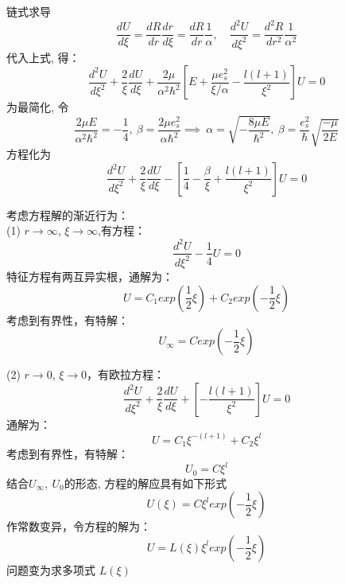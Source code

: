 \begin{frame}	
链式求导
\[\frac{d U }{d \xi } = \frac{d R }{d r } \frac{d r }{d \xi } = \frac{d R }{d r } \frac{1}{\alpha}, \quad \frac{d^2 U }{d \xi ^2 } =  \frac{d^2 R }{d r^2 } \frac{1}{\alpha ^2}\]
代入上式, 得：
\begin{equation*}
\frac{d^2 U}{d \xi ^2} + \frac{2}{\xi }\frac{d U }{d \xi} + \dfrac{2\mu}{\alpha ^2 \hbar^2}\left[E+\dfrac{\mu e^2 _s}{\xi/\alpha} - \frac{l(l+1)}{\xi ^2}\right] U=0  
\end{equation*}	
为最简化, 令 
\[ \dfrac{2\mu E}{\alpha ^2 \hbar^2}= -\frac{1} {4}, ~\beta=\dfrac{2\mu e^2 _s}{\alpha \hbar^2} \implies ~\alpha =\sqrt{-\dfrac{8\mu E}{\hbar^2}}, ~\beta=\dfrac{ e^2 _s}{\hbar} \sqrt{\frac{-\mu}{2E}}  \]
方程化为
\begin{equation}\label{eq:lagu}
\frac{d^2 U}{d \xi ^2} + \frac{2}{\xi }\frac{d U }{d \xi}  -[ \frac{1} {4}  -\frac{\beta}{\xi} + \frac{l(l+1)}{\xi ^2}] U=0 
\end{equation}
\end{frame}	

\begin{frame} 
考虑方程解的渐近行为： \\
(1) $r\to \infty$, $\xi \to \infty$,有方程：
\begin{equation*}
  \frac{d^2 U}{d \xi ^2}   - \frac{1} {4}  U=0
\end{equation*}	
特征方程有两互异实根，通解为：
\begin{equation*}
  U=C_1 exp(\frac{1}{2}\xi ) +C_2 exp(-\frac{1}{2}\xi ) 
\end{equation*}	
考虑到有界性，有特解：
\begin{equation*}
  U_\infty  =  C  exp(-\frac{1}{2}\xi ) 
\end{equation*}	
\end{frame}	

\begin{frame}
(2) $r\to 0$, $\xi \to 0$，有欧拉方程：
\begin{equation*}
  \frac{d^2 U}{d \xi ^2} + \frac{2}{\xi }\frac{d U }{d \xi}  +[ - \frac{l(l+1)}{\xi ^2}] U=0
\end{equation*}	 
通解为：
\begin{equation*}
  U=C_1 \xi ^{-(l+1)}+C_2 \xi ^ l 
\end{equation*}	
考虑到有界性，有特解：
\begin{equation*}
  U_0=C  \xi ^ l 
\end{equation*}
结合$U_\infty,~U_0 $的形态, 方程的解应具有如下形式 
\begin{equation*}
  U(\xi)=C \xi ^ l  exp(-\frac{1}{2}\xi ) 
\end{equation*}		
作常数变异，令方程的解为：
\begin{equation*}
  U=L(\xi)  \xi ^ l  exp(-\frac{1}{2}\xi ) 
\end{equation*}	
问题变为求多项式 $L(\xi)$
\end{frame}	

